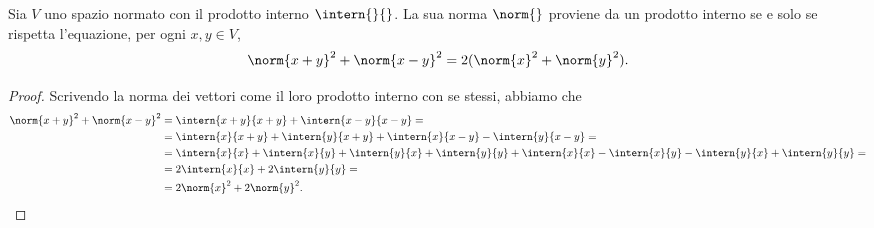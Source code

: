 \begin{proprieta} \label{p:regola-parallelogramma}
	Sia $V$ uno spazio normato con il prodotto interno $\intern{}{}$.
	La sua norma $\norm{}$ proviene da un prodotto interno se e solo se rispetta l'equazione, per ogni $  x,  y\in V$,
	\begin{equation}
		\norm{  x+  y}^2+\norm{  x-  y}^2=2(\norm{  x}^2+\norm{  y}^2).
		\label{eq:regola-parallelogramma}
	\end{equation}
\end{proprieta}
\begin{proof}
	Scrivendo la norma dei vettori come il loro prodotto interno con se stessi, abbiamo che
	\begin{equation*}
		\begin{split}
			\norm{  x+  y}^2+\norm{  x-  y}^2&=\intern{  x+  y}{  x+  y}+\intern{  x-  y}{  x-  y}=\\
			&=\intern{  x}{  x+  y}+\intern{  y}{  x+  y}+\intern{  x}{  x-  y}-\intern{  y}{  x-  y}=\\
			&=\intern{  x}{  x}+\intern{  x}{  y}+\intern{  y}{  x}+\intern{  y}{  y}+\intern{  x}{  x}-\intern{  x}{  y}-\intern{  y}{  x}+\intern{  y}{  y}=\\
			&=2\intern{  x}{  x}+2\intern{  y}{  y}=\\
			&=2\norm{  x}^2+2\norm{  y}^2.
		\end{split}
	\end{equation*}
\end{proof}


